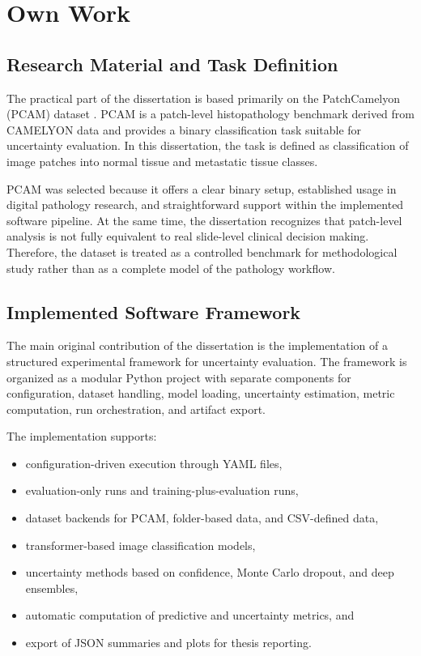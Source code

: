 \chapter{Own Work}
\label{chap:own_work}

\section{Research Material and Task Definition}

The practical part of the dissertation is based primarily on the PatchCamelyon (PCAM) dataset \cite{veeling2018rotation,pcamchallenge}. PCAM is a patch-level histopathology benchmark derived from CAMELYON data and provides a binary classification task suitable for uncertainty evaluation. In this dissertation, the task is defined as classification of image patches into normal tissue and metastatic tissue classes.

PCAM was selected because it offers a clear binary setup, established usage in digital pathology research, and straightforward support within the implemented software pipeline. At the same time, the dissertation recognizes that patch-level analysis is not fully equivalent to real slide-level clinical decision making. Therefore, the dataset is treated as a controlled benchmark for methodological study rather than as a complete model of the pathology workflow.

\section{Implemented Software Framework}

The main original contribution of the dissertation is the implementation of a structured experimental framework for uncertainty evaluation. The framework is organized as a modular Python project with separate components for configuration, dataset handling, model loading, uncertainty estimation, metric computation, run orchestration, and artifact export.

The implementation supports:

\begin{itemize}
    \item configuration-driven execution through YAML files,
    \item evaluation-only runs and training-plus-evaluation runs,
    \item dataset backends for PCAM, folder-based data, and CSV-defined data,
    \item transformer-based image classification models,
    \item uncertainty methods based on confidence, Monte Carlo dropout, and deep ensembles,
    \item automatic computation of predictive and uncertainty metrics, and
    \item export of JSON summaries and plots for thesis reporting.
\end{itemize}

